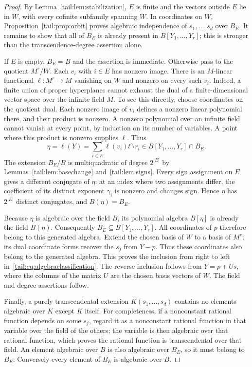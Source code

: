 \documentclass[11pt,a4paper]{article}
\numberwithin{equation}{section}
\theoremstyle{definition}
\theoremstyle{remark}
\begin{document}
\begin{proof}
By Lemma~\ref{tail:lem:stabilization}, $E$ is finite and the vectors outside
$E$ lie in $W$, with every cofinite subfamily spanning $W$. In coordinates
on $W$, Proposition~\ref{tail:prop:orbit} proves algebraic independence of
$s_1,\ldots,s_d$ over $B_E$. It remains to show that all of $B_E$ is
already present in $B[Y_1,\ldots,Y_r]$; this is stronger than the
transcendence-degree assertion alone.

If $E$ is empty, $B_E=B$ and the assertion is immediate. Otherwise pass
to the quotient $M^r/W$. Each $v_i$ with $i\in E$ has nonzero image.
There is an $M$-linear functional $\ell:M^r\to M$ vanishing on $W$ and
nonzero on every such $v_i$. Indeed, a finite union of proper hyperplanes
cannot exhaust the dual of a finite-dimensional vector space over the
infinite field $M$. To see this directly, choose coordinates on the quotient
dual. Each nonzero image of $v_i$ defines a nonzero linear polynomial
there, and their product is nonzero. A nonzero polynomial over an
infinite field cannot vanish at every point, by induction on its number
of variables. A point where this product is nonzero supplies $\ell$.
Thus
\begin{equation}\label{tail:eq:primitiveeta}
 \eta=\ell(Y)=\sum_{i\in E}\ell(v_i)t^{\gamma_i}r_i
             \in B[Y_1,\ldots,Y_r]\cap B_E.
\end{equation}
The extension $B_E/B$ is multiquadratic of degree $2^{|E|}$ by
Lemmas~\ref{tail:lem:basechange} and~\ref{tail:lem:signs}. Every sign assignment
on $E$ gives a different conjugate of $\eta$: at an index where two
assignments differ, the coefficient of its distinct exponent $\gamma_i$
is nonzero and changes sign. Hence $\eta$ has $2^{|E|}$ distinct
conjugates, and $B(\eta)=B_E$.

Because $\eta$ is algebraic over the field $B$, its polynomial algebra
$B[\eta]$ is already the field $B(\eta)$. Consequently
$B_E\subseteq B[Y_1,\ldots,Y_r]$. All coordinates of $p$ therefore
belong to this generated algebra. Extend the chosen basis of $W$ to a
basis of $M^r$; its dual coordinate forms recover the $s_j$ from $Y-p$.
Thus these coordinates also belong to the generated algebra. This proves the
inclusion from right
to left in~\eqref{tail:eq:algebraclassification}. The reverse inclusion follows
from $Y=p+Us$, where the columns of the matrix $U$ are the chosen basis
vectors of $W$. The field and degree assertions follow.

Finally, a purely transcendental extension $K(s_1,\ldots,s_d)$ contains
no elements algebraic over $K$ except $K$ itself. For completeness, if a
nonconstant rational function depends on some $s_j$, regard it as a
nonconstant rational function in that variable over the field of the
others; the variable is then algebraic over that rational function,
which proves the rational function is transcendental over that field.
An element algebraic over $B$ is also algebraic over $B_E$, so it must
belong to $B_E$. Conversely every element of $B_E$ is algebraic over $B$.
\end{proof}
\end{document}

